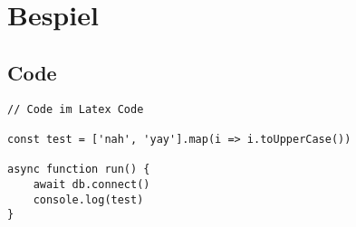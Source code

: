 \section{Bespiel}

\subsection{Code}

\begin{lstlisting}[caption={Code im Latex Code}]
// Code im Latex Code

const test = ['nah', 'yay'].map(i => i.toUpperCase())

async function run() {
    await db.connect()
    console.log(test)
}
\end{lstlisting}